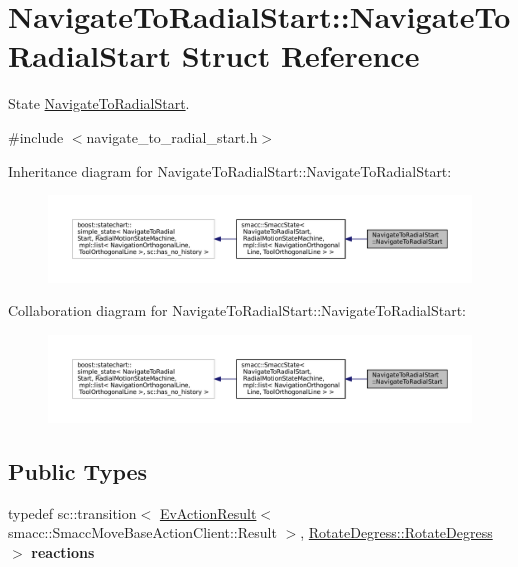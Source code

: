 \hypertarget{structNavigateToRadialStart_1_1NavigateToRadialStart}{}\section{Navigate\+To\+Radial\+Start\+:\+:Navigate\+To\+Radial\+Start Struct Reference}
\label{structNavigateToRadialStart_1_1NavigateToRadialStart}


State \hyperlink{structNavigateToRadialStart_1_1NavigateToRadialStart}{Navigate\+To\+Radial\+Start}.  




{\ttfamily \#include $<$navigate\+\_\+to\+\_\+radial\+\_\+start.\+h$>$}



Inheritance diagram for Navigate\+To\+Radial\+Start\+:\+:Navigate\+To\+Radial\+Start\+:
\nopagebreak
\begin{figure}[H]
\begin{center}
\leavevmode
\includegraphics[width=350pt]{structNavigateToRadialStart_1_1NavigateToRadialStart__inherit__graph}
\end{center}
\end{figure}


Collaboration diagram for Navigate\+To\+Radial\+Start\+:\+:Navigate\+To\+Radial\+Start\+:
\nopagebreak
\begin{figure}[H]
\begin{center}
\leavevmode
\includegraphics[width=350pt]{structNavigateToRadialStart_1_1NavigateToRadialStart__coll__graph}
\end{center}
\end{figure}
\subsection*{Public Types}
\begin{DoxyCompactItemize}
\item 
\mbox{\label{structNavigateToRadialStart_1_1NavigateToRadialStart_a17f989999daba76df5aebd3424e54091}} 
typedef sc\+::transition$<$ \hyperlink{structsmacc_1_1EvActionResult}{Ev\+Action\+Result}$<$ smacc\+::\+Smacc\+Move\+Base\+Action\+Client\+::\+Result $>$, \hyperlink{structRotateDegress_1_1RotateDegress}{Rotate\+Degress\+::\+Rotate\+Degress} $>$ {\bfseries reactions}
\end{DoxyCompactItemize}
